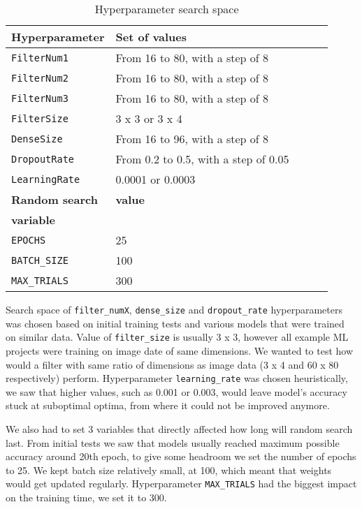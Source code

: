\begin{table}
    \centering
    \begin{tabular}{@{} *5l @{}}    \toprule
        \textbf{Hyperparameter} & \textbf{Set of values}\\\midrule
        \verb|FilterNum1|   & From 16 to 80, with a step of 8\\ 
        \verb|FilterNum2|   & From 16 to 80, with a step of 8\\ 
        \verb|FilterNum3|   & From 16 to 80, with a step of 8\\
        \verb|FilterSize|   & 3 x 3 or 3 x 4\\
        \verb|DenseSize|    & From 16 to 96, with a step of 8\\
        \verb|DropoutRate|  & From 0.2 to 0.5, with a step of 0.05\\
        \verb|LearningRate| & 0.0001 or 0.0003\\\toprule
        \textbf{Random search} & \textbf{value}\\
        \textbf{variable}      & \\\midrule
        \verb|EPOCHS|        & 25\\
        \verb|BATCH_SIZE|    & 100\\
        \verb|MAX_TRIALS|    & 300\\\bottomrule
    \end{tabular}
    \caption{ Hyperparameter search space}
    \label{hyperparameter_table}
\end{table}

Search space of \verb|filter_numX|, \verb|dense_size| and \verb|dropout_rate| hyperparameters was chosen based on initial training tests and various models that were trained on similar data.
Value of \verb|filter_size| is usually 3 x 3, however all example ML projects were training on image date of same dimensions.
We wanted to test how would a filter with same ratio of dimensions as image data (3 x 4 and 60 x 80 respectively) perform.
Hyperparameter \verb|learning_rate| was chosen heuristically, we saw that higher values, such as 0.001 or 0.003, would leave model's accuracy stuck at suboptimal optima, from where it could not be improved anymore.

We also had to set 3 variables that directly affected how long will random search last.
From initial tests we saw that models usually reached maximum possible accuracy around 20th epoch, to give some headroom we set the number of epochs to 25.
We kept batch size relatively small, at 100, which meant that weights would get updated regularly.
Hyperparameter \verb|MAX_TRIALS| had the biggest impact on the training time, we set it to 300.

